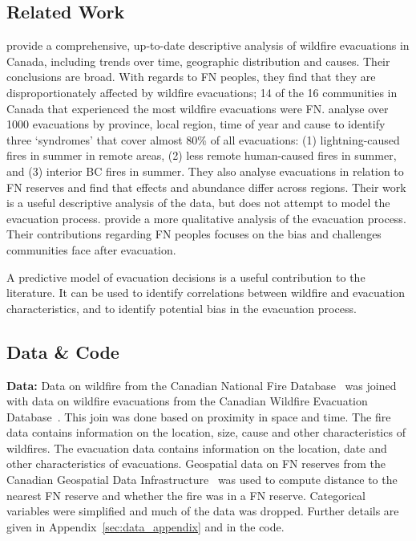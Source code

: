 \subsection{Related Work}\label{sec:related_work}

\cite{wildfire_evacs} provide a comprehensive, up-to-date descriptive analysis of wildfire evacuations in Canada, including trends over time, geographic distribution and causes. Their conclusions are broad. With regards to FN peoples, they find that they are disproportionately affected by wildfire evacuations; 14 of the 16 communities in Canada that experienced the most wildfire evacuations were FN. \cite{wildfire_syndromes} analyse over 1000 evacuations by province, local region, time of year and cause to identify three `syndromes' that cover almost 80\% of all evacuations: (1) lightning-caused fires in summer in remote areas, (2) less remote human-caused fires in summer, and (3) interior BC fires in summer. They also analyse evacuations in relation to FN reserves and find that effects and abundance differ across regions. Their work is a useful descriptive analysis of the data, but does not attempt to model the evacuation process. \cite{wildfire_management_evacuation_review} provide a more qualitative analysis of the evacuation process. Their contributions regarding FN peoples focuses on the bias and challenges communities face after evacuation.

A predictive model of evacuation decisions is a useful contribution to the literature. It can be used to identify correlations between wildfire and evacuation characteristics, and to identify potential bias in the evacuation process.

\subsection{Data \& Code}\label{sec:data}

\textbf{Data:} Data on wildfire from the Canadian National Fire Database~\citep{cnfdb} was joined with data on wildfire evacuations from the Canadian Wildfire Evacuation Database~\citep{evacdb}. This join was done based on proximity in space and time. The fire data contains information on the location, size, cause and other characteristics of wildfires. The evacuation data contains information on the location, date and other characteristics of evacuations. Geospatial data on FN reserves from the Canadian Geospatial Data Infrastructure~\citep{reservesdb} was used to compute distance to the nearest FN reserve and whether the fire was in a FN reserve. Categorical variables were simplified and much of the data was dropped. Further details are given in Appendix~\ref{sec:data_appendix} and in the code.

